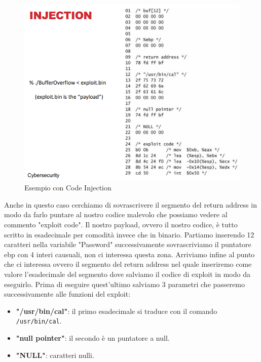 \begin{figure}[H]
    \centering
    \includegraphics[width=12cm, keepaspectratio]{capitoli/secure_coding/img/cap_2/es_pass_ok_code_inj.png}
    \caption{Esempio con Code Injection}\label{fig:es_pass_ok_code_inj}
\end{figure}
Anche in questo caso cerchiamo di sovrascrivere il segmento del return address in modo da farlo puntare al nostro codice malevolo che possiamo vedere al commento "exploit code". Il nostro payload, ovvero il nostro codice, è tutto scritto in esadecimale per comodità invece che in binario. Partiamo inserendo 12 caratteri nella variabile "Password" successivamente sovrascriviamo il puntatore ebp con 4 interi causuali, non ci interessa questa zona. Arriviamo infine al punto che ci interessa ovvero il segmento del return address nel quale inseriremo come valore l'esadecimale del segmento dove salviamo il codice di exploit in modo da eseguirlo. Prima di eseguire quest'ultimo salviamo 3 parametri che passeremo successivamente alle funzioni del exploit:
\begin{itemize}
    \item \textbf{"/usr/bin/cal"}: il primo esadecimale si traduce con il comando \verb|/usr/bin/cal|.
    \item \textbf{"null pointer"}: il secondo è un puntatore a null.
    \item \textbf{"NULL"}: caratteri nulli.
\end{itemize}

